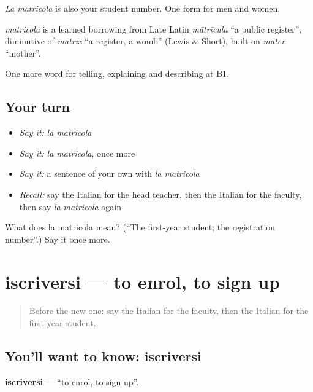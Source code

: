 \emph{La matricola} is also your student number. One form for men and women.

\begin{cousinweb}
\emph{matricola} is a learned borrowing from Late Latin \emph{mātrīcula} \textquotedblleft{}a public register\textquotedblright{}, diminutive of \emph{mātrīx} \textquotedblleft{}a register, a womb\textquotedblright{} (Lewis \& Short), built on \emph{māter} \textquotedblleft{}mother\textquotedblright{}.
\end{cousinweb}

\begin{grammarlens}[title={What you've built}]
One more word for telling, explaining and describing at B1.
\end{grammarlens}

\subsection*{Your turn}
\begin{itemize}
\raggedright
  \item \emph{Say it:} \emph{la matricola}
  \item \emph{Say it:} \emph{la matricola}, once more
  \item \emph{Say it:} a sentence of your own with \emph{la matricola}
  \item \emph{Recall:} say the Italian for the head teacher, then the Italian for the faculty, then say \emph{la matricola} again
\end{itemize}

\begin{tcolorbox}[breakable,colback=teal!4,colframe=teal!35!black,title={Before you move on}]
What does la matricola mean? (\textquotedblleft{}The first-year student; the registration number\textquotedblright{}.) Say it once more.
\end{tcolorbox}
\section[iscriversi]{iscriversi — to enrol, to sign up}

\label{lesson:IT-C380-iscriversi}



\begin{quote}
Before the new one: say the Italian for the faculty, then the Italian for the first-year student.
\end{quote}

\subsection*{You'll want to know: iscriversi}
\textbf{iscriversi} — \textquotedblleft{}to enrol, to sign up\textquotedblright{}.

